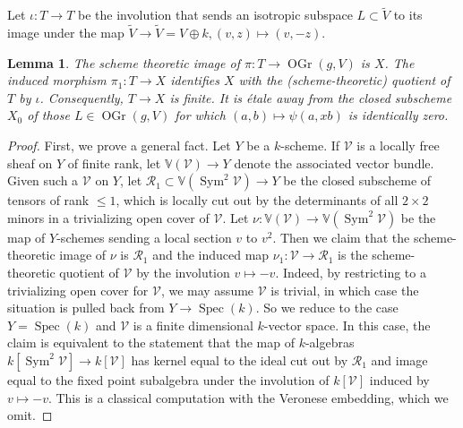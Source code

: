 \documentclass{article} %
\newtheorem{lemma}[proposition]{Lemma}
\numberwithin{equation}{section}
\DeclareMathOperator{\Sym}{Sym}
\DeclareMathOperator{\Spec}{Spec}
\newcommand{\sh}[1]{\mathscr{#1}}
\DeclareMathOperator{\OGr}{OGr}
\begin{document}
Let $\iota\colon T\rightarrow T$ be the involution that sends an isotropic subspace $L\subset \tilde{V}$ to its image under the map $\tilde{V} \rightarrow \tilde{V} = V \oplus k, (v,z)\mapsto (v,-z)$.
\begin{lemma}\label{lem_image_T_in_OGr}
    The scheme theoretic image of $\pi\colon T\rightarrow \OGr(g,V)$ is $X$.
    The induced morphism $\pi_1\colon T\rightarrow X$ identifies $X$ with the (scheme-theoretic) quotient of $T$ by $\iota$.
    Consequently, $T\rightarrow X$ is finite.
    It is \'etale away from the closed subscheme $X_0$ of those $L\in \OGr(g,V)$ for which $(a,b)\mapsto \psi(a,xb)$ is identically zero.
 \end{lemma}
 \begin{proof}
    First, we prove a general fact.
    Let $Y$ be a $k$-scheme. If $\sh{V}$ is a locally free sheaf on $Y$ of finite rank, let $\mathbb{V}(\sh{V})\rightarrow Y$ denote the associated vector bundle.
    Given such a $\sh{V}$ on $Y$, let $\mathcal{R}_1\subset\mathbb{V}(\Sym^2\sh{V}) \rightarrow Y$ be the closed subscheme of tensors of rank $\leq 1$, which is locally cut out by the determinants of all $2\times 2$ minors in a trivializing open cover of $\sh{V}$.
    Let $\nu\colon \mathbb{V}(\sh{V})\rightarrow \mathbb{V}(\Sym^2 \sh{V})$ be the map of $Y$-schemes sending a local section $v$ to $v^2$.
    Then we claim that the scheme-theoretic image of $\nu$ is $\mathcal{R}_1$ and the induced map $\nu_1\colon \sh{V}\rightarrow \mathcal{R}_1$ is the scheme-theoretic quotient of $\sh{V}$ by the involution $v\mapsto -v$.
    Indeed, by restricting to a trivializing open cover for $\sh{V}$, we may assume $\sh{V}$ is trivial, in which case the situation is pulled back from $Y\rightarrow \Spec(k)$.
    So we reduce to the case $Y = \Spec(k)$ and $\sh{V}$ is a finite dimensional $k$-vector space.
    In this case, the claim is equivalent to the statement that the map of $k$-algebras $k[\Sym^2 \sh{V}]\rightarrow k[\sh{V}]$ has kernel equal to the ideal cut out by $\mathcal{R}_1$ and image equal to the fixed point subalgebra under the involution of $k[\sh{V}]$ induced by $v\mapsto -v$.
    This is a classical computation with the Veronese embedding, which we omit.


\end{proof}
\end{document}
